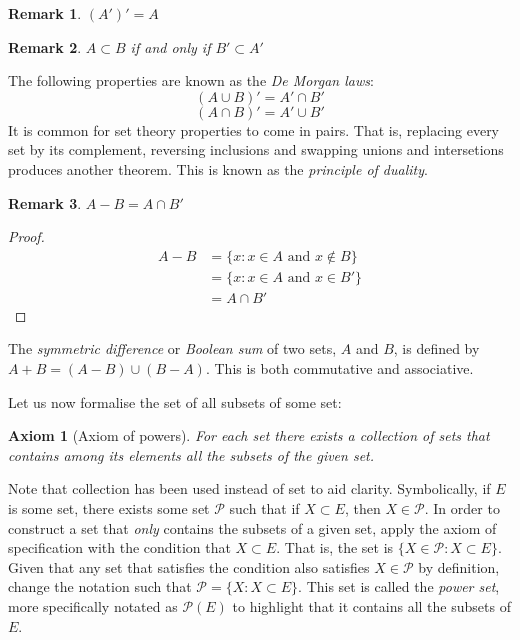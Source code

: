 \documentclass[12pt]{article}
\newtheorem{axiom}{Axiom}
\newtheorem{remark}{Remark}
\begin{document}
\begin{remark}
    $(A')' = A$
\end{remark}

\begin{remark}
    $A \subset B$ if and only if $B' \subset A'$
\end{remark}

The following properties are known as the \textit{De Morgan laws}:
\begin{equation}
    (A \cup B)' = A' \cap B'
\end{equation}
\begin{equation}
    (A \cap B)' = A' \cup B'
\end{equation}
It is common for set theory properties to come in pairs. That is, replacing every set by its complement,
reversing inclusions and swapping unions and intersetions produces another theorem. This is known as the \textit{principle
of duality}.

\begin{remark}
    $A - B = A \cap B'$
\end{remark}
\begin{proof}
    \begin{eqnarray*}
        A - B &=\{x: x \in A \text{ and } x \notin B\}\\
              &= \{x: x \in A \text{ and } x \in B'\}\\
              &= A \cap B'
    \end{eqnarray*}
\end{proof}

The \textit{symmetric difference} or \textit{Boolean sum} of two sets, $A$ and $B$, is
defined by $A + B = (A - B) \cup (B - A)$. This is both commutative and associative.

Let us now formalise the set of all subsets of some set:
\begin{axiom}[Axiom of powers]
    For each set there exists a collection of sets that contains among its elements all the subsets
    of the given set.
\end{axiom}
Note that collection has been used instead of set to aid clarity. Symbolically, if $E$ is some set, there
exists some set $\mathcal{P}$ such that if $X \subset E$, then $X \in \mathcal{P}$. In order to construct
a set that \textit{only} contains the subsets of a given set, apply the axiom of specification with the
condition that $X \subset E$. That is, the set is $\{X \in \mathcal{P}: X \subset E\}$. Given that any
set that satisfies the condition also satisfies $X \in \mathcal{P}$ by definition, change the notation
such that $\mathcal{P} = \{X: X \subset E\}$. This set is called the \textit{power set}, more specifically
notated as $\mathcal{P}(E)$ to highlight that it contains all the subsets of $E$.
\end{document}
